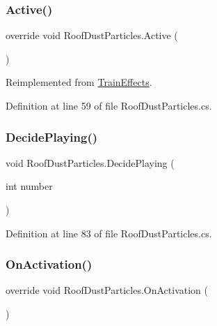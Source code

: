 \subsubsection{\texorpdfstring{Active()}{Active()}}
{\footnotesize\ttfamily override void Roof\+Dust\+Particles.\+Active (\begin{DoxyParamCaption}{ }\end{DoxyParamCaption})\hspace{0.3cm}{\ttfamily [virtual]}}



Reimplemented from \mbox{\hyperlink{class_train_effects_a444cb0c6444a8945f5e1a7f02dc83b99}{Train\+Effects}}.



Definition at line 59 of file Roof\+Dust\+Particles.\+cs.

\mbox{\label{class_roof_dust_particles_a742d0ce2b04e77bcb8b6fb172ecf5a36}} 
\subsubsection{\texorpdfstring{Decide\+Playing()}{DecidePlaying()}}
{\footnotesize\ttfamily void Roof\+Dust\+Particles.\+Decide\+Playing (\begin{DoxyParamCaption}\item[{int}]{number }\end{DoxyParamCaption})}



Definition at line 83 of file Roof\+Dust\+Particles.\+cs.

\mbox{\label{class_roof_dust_particles_a34d700905e7de95c5381309d20846f1b}} 
\subsubsection{\texorpdfstring{On\+Activation()}{OnActivation()}}
{\footnotesize\ttfamily override void Roof\+Dust\+Particles.\+On\+Activation (\begin{DoxyParamCaption}{ }\end{DoxyParamCaption})\hspace{0.3cm}{\ttfamily [virtual]}}



